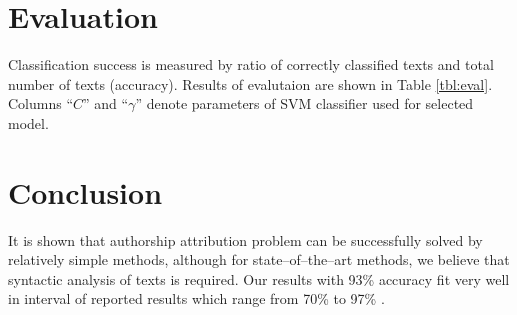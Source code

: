 \documentclass[11pt,english]{article}
\begin{document}
\begin{multicols}{2}
\section{Evaluation}
\label{sec:evaluacija}
Classification success is measured by ratio of correctly classified texts and
total number of texts (accuracy). Results of evalutaion are shown in Table
\ref{tbl:eval}. Columns ``$C$'' and ``$\gamma$'' denote parameters of SVM
classifier used for selected model.


% 
% 

\section{Conclusion}
It is shown that authorship attribution problem can be successfully solved by
relatively simple methods, although for state--of--the--art methods, we
believe that syntactic analysis of texts is required. Our results with
93\% accuracy fit very well in interval of reported results which range from
70\% to 97\% \citep{coyotl2006authorship,keselj2003n,luyckx2005shallow,stamatatos2001computer}.


\end{multicols}
\end{document}
